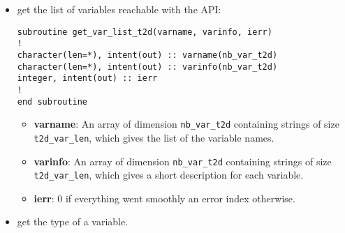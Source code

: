 \begin{itemize}

\item get the list of variables reachable with the API:
\begin{lstlisting}
subroutine get_var_list_t2d(varname, varinfo, ierr)
!
character(len=*), intent(out) :: varname(nb_var_t2d)
character(len=*), intent(out) :: varinfo(nb_var_t2d)
integer, intent(out) :: ierr
!
end subroutine
\end{lstlisting}
\begin{itemize}
\item \textbf{varname}: An array  of dimension \verb!nb_var_t2d! containing
  strings of size \verb!t2d_var_len!, which gives the list of the variable
  names.
\item \textbf{varinfo}: An array  of dimension \verb!nb_var_t2d! containing
  strings of size \verb!t2d_var_len!, which gives a short description for
  each variable.
\item \textbf{ierr}: 0 if everything went smoothly an error index otherwise.
\end{itemize}

\item get the type of a variable.


\end{itemize}
